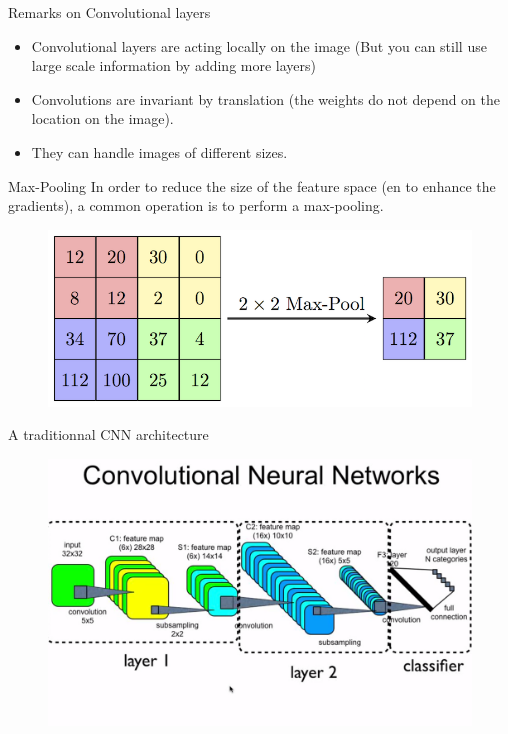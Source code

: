 \documentclass[handout]{beamer}
\begin{document}
\begin{frame}{Remarks on Convolutional layers}
\begin{itemize}
    \item Convolutional layers are acting locally on the image (But you can still use large scale information by adding more layers)
    \item Convolutions are invariant by translation (the weights do not depend on the location on the image).
    \item They can handle images of different sizes.
    
\end{itemize}
    
\end{frame}
\begin{frame}{Max-Pooling}
    In order to reduce the size of the feature space (en to enhance the gradients), a common operation is to perform a max-pooling.
    \begin{figure}
   \centering
    \includegraphics[width=.6\textwidth]{fig/L2/MaxpoolSample2.png}
\end{figure}
\end{frame}

\begin{frame}[fragile]{A traditionnal CNN architecture}
    \begin{figure}
\centering
    \includegraphics[width=.8\textwidth,trim={0 0cm 0cm 3cm},clip]{fig/L2/CNN.png}
\end{figure}
\end{frame}
\end{document}
